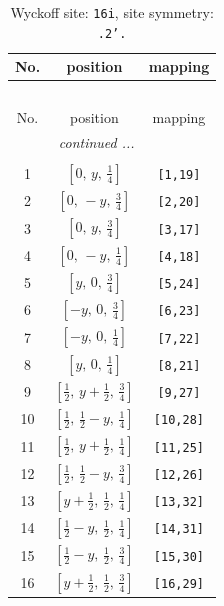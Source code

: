 \documentclass[fleqn,8pt]{jsarticle}
\begin{document}
\renewcommand{\arraystretch}{1.2}
\begin{longtable}{ccc}
\caption{Wyckoff site: {\tt 16i}, site symmetry: {\tt .2'.}}
 \\
 \hline \hline
No. & position & mapping \\ \hline \endfirsthead

\multicolumn{2}{l}{\tablename\ \thetable{}} \\
 \hline \hline
No. & position & mapping \\ \hline \endhead

 \hline \hline
\multicolumn{2}{r}{\footnotesize\it continued ...} \\ \endfoot

 \hline \hline
\multicolumn{2}{r}{} \\ \endlastfoot

1 & $\left[ 0,\, y,\, \frac{1}{4} \right]$ & {\tt [1,19]} \\ \hline
2 & $\left[ 0,\, - y,\, \frac{3}{4} \right]$ & {\tt [2,20]} \\ \hline
3 & $\left[ 0,\, y,\, \frac{3}{4} \right]$ & {\tt [3,17]} \\ \hline
4 & $\left[ 0,\, - y,\, \frac{1}{4} \right]$ & {\tt [4,18]} \\ \hline
5 & $\left[ y,\, 0,\, \frac{3}{4} \right]$ & {\tt [5,24]} \\ \hline
6 & $\left[ - y,\, 0,\, \frac{3}{4} \right]$ & {\tt [6,23]} \\ \hline
7 & $\left[ - y,\, 0,\, \frac{1}{4} \right]$ & {\tt [7,22]} \\ \hline
8 & $\left[ y,\, 0,\, \frac{1}{4} \right]$ & {\tt [8,21]} \\ \hline
9 & $\left[ \frac{1}{2},\, y + \frac{1}{2},\, \frac{3}{4} \right]$ & {\tt [9,27]} \\ \hline
10 & $\left[ \frac{1}{2},\, \frac{1}{2} - y,\, \frac{1}{4} \right]$ & {\tt [10,28]} \\ \hline
11 & $\left[ \frac{1}{2},\, y + \frac{1}{2},\, \frac{1}{4} \right]$ & {\tt [11,25]} \\ \hline
12 & $\left[ \frac{1}{2},\, \frac{1}{2} - y,\, \frac{3}{4} \right]$ & {\tt [12,26]} \\ \hline
13 & $\left[ y + \frac{1}{2},\, \frac{1}{2},\, \frac{1}{4} \right]$ & {\tt [13,32]} \\ \hline
14 & $\left[ \frac{1}{2} - y,\, \frac{1}{2},\, \frac{1}{4} \right]$ & {\tt [14,31]} \\ \hline
15 & $\left[ \frac{1}{2} - y,\, \frac{1}{2},\, \frac{3}{4} \right]$ & {\tt [15,30]} \\ \hline
16 & $\left[ y + \frac{1}{2},\, \frac{1}{2},\, \frac{3}{4} \right]$ & {\tt [16,29]} \\
\end{longtable}
\end{document}
